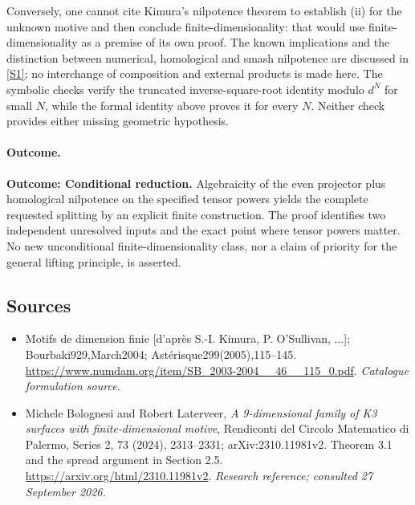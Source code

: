 \documentclass[11pt,a4paper]{article}
\newcommand{\sref}[2]{\hyperlink{source:#1:#2}{[S#2]}}
\numberwithin{equation}{section}
\begin{document}
Conversely, one cannot cite Kimura's nilpotence theorem to establish (ii) for the unknown motive and then conclude finite-dimensionality: that would use finite-dimensionality as a premise of its own proof. The known implications and the distinction between numerical, homological and smash nilpotence are discussed in \sref{191}{1}; no interchange of composition and external products is made here. The symbolic checks verify the truncated inverse-square-root identity modulo $d^N$ for small $N$, while the formal identity above proves it for every $N$. Neither check provides either missing geometric hypothesis.

\paragraph{Outcome.}
\textbf{Outcome: Conditional reduction.}
Algebraicity of the even projector plus homological nilpotence on the specified tensor powers yields the complete requested splitting by an explicit finite construction. The proof identifies two independent unresolved inputs and the exact point where tensor powers matter. No new unconditional finite-dimensionality class, nor a claim of priority for the general lifting principle, is asserted.

\subsection{Sources}
\begin{itemize}\raggedright
\item[\textnormal{[S1]}]\hypertarget{source:191:1}{} Motifs de dimension finie [d'après S.-I. Kimura, P. O'Sullivan, ...]; Bourbaki929,March2004; Astérisque299(2005),115–145.
\url{https://www.numdam.org/item/SB_2003-2004__46__115_0.pdf}.
{\small\textit{Catalogue formulation source.}}
\item[\textnormal{[E1]}]\hypertarget{extra:191:1}{} Michele Bolognesi and Robert Laterveer, \emph{A 9-dimensional family of K3 surfaces with finite-dimensional motive}, Rendiconti del Circolo Matematico di Palermo, Series 2, 73 (2024), 2313--2331; arXiv:2310.11981v2. Theorem 3.1 and the spread argument in Section 2.5.
\url{https://arxiv.org/html/2310.11981v2}.
{\small\textit{Research reference; consulted 27 September 2026.}}
\end{itemize}
\end{document}

